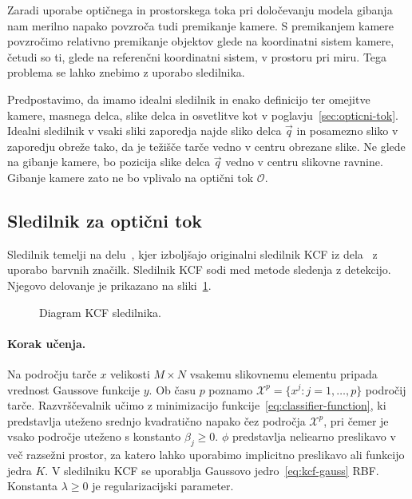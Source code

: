 Zaradi uporabe optičnega in prostorskega toka pri določevanju modela gibanja nam merilno napako povzroča tudi premikanje kamere. S premikanjem kamere povzročimo relativno premikanje objektov glede na koordinatni sistem kamere, četudi so ti, glede na referenčni koordinatni sistem, v prostoru pri miru. Tega problema se lahko znebimo z uporabo sledilnika. 

Predpostavimo, da imamo idealni sledilnik in enako definicijo ter omejitve kamere, masnega delca, slike delca in osvetlitve kot v poglavju~\ref{sec:opticni-tok}. Idealni sledilnik v vsaki sliki zaporedja najde sliko delca $\vec{q}$ in posamezno sliko v zaporedju obreže tako, da je težišče tarče vedno v centru obrezane slike. Ne glede na gibanje kamere, bo pozicija slike delca $\vec{q}$ vedno v centru slikovne ravnine. Gibanje kamere zato ne bo vplivalo na optični tok $\mathcal{O}$.



\subsection{Sledilnik za optični tok} 
Sledilnik temelji na delu~\cite{danelljan2014adaptive}, kjer izboljšajo originalni sledilnik KCF iz dela~\cite{henriques2012exploiting} z uporabo barvnih značilk. Sledilnik KCF sodi med metode sledenja z detekcijo. Njegovo delovanje je prikazano na sliki~\ref{fig:diagram-kcf}.

\begin{figure}[htb]
	\centering
	\resizebox{\columnwidth}{!}{}
	\caption[Diagram KCF sledilnika]{Diagram KCF sledilnika.}
	\label{fig:diagram-kcf}
\end{figure}


\paragraph{Korak učenja.}
Na področju tarče $x$ velikosti $M \times N$ vsakemu slikovnemu elementu pripada vrednost Gaussove funkcije $y$. Ob času $p$ poznamo \hbox{$\mathcal{X}^p = \{x^j: j=1,\ldots,p\}$} področij tarče. Razvrščevalnik učimo z minimizacijo funkcije~\eqref{eq:classifier-function}, ki predstavlja uteženo srednjo kvadratično napako čez področja $\mathcal{X}^p$, pri čemer je vsako področje uteženo s konstanto $\beta_j \geq 0$. $\phi$ predstavlja neliearno preslikavo v več razsežni prostor, za katero lahko uporabimo implicitno preslikavo ali funkcijo jedra $K$. V sledilniku KCF se uporablja Gaussovo jedro~\eqref{eq:kcf-gauss} RBF. Konstanta $\lambda \geq 0$ je regularizacijski parameter.

